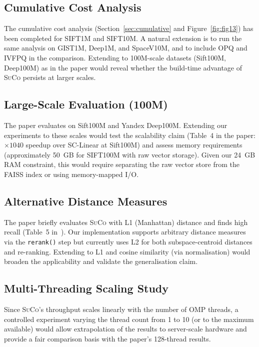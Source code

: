 \documentclass[11pt,a4paper]{article}
\newcommand{\suco}{\textsc{SuCo}}
\begin{document}
\subsection{Cumulative Cost Analysis}

The cumulative cost analysis (Section~\ref{sec:cumulative} and
Figure~\ref{fig:fig13}) has been completed for SIFT1M and SIFT10M.
A natural extension is to run the same analysis on GIST1M, Deep1M, and
SpaceV10M, and to include OPQ and IVFPQ in the comparison.
Extending to 100M-scale datasets (Sift100M, Deep100M) as in the paper would
reveal whether the build-time advantage of \suco{} persists at larger scales.

\subsection{Large-Scale Evaluation (100M)}

The paper evaluates on Sift100M and Yandex Deep100M.  Extending our
experiments to these scales would test the scalability claim (Table~4 in
the paper: $\times 1040$ speedup over SC-Linear at Sift100M) and assess
memory requirements (approximately 50~GB for SIFT100M with raw vector storage).
Given our 24~GB RAM constraint, this would require separating the raw vector
store from the FAISS index or using memory-mapped I/O.

\subsection{Alternative Distance Measures}

The paper briefly evaluates \suco{} with L1 (Manhattan) distance and finds
high recall (Table~5 in~\cite{wei2025suco}).  Our implementation supports
arbitrary distance measures via the \texttt{rerank()} step but currently
uses L2 for both subspace-centroid distances and re-ranking.  Extending to L1
and cosine similarity (via normalisation) would broaden the applicability and
validate the generalisation claim.

\subsection{Multi-Threading Scaling Study}

Since \suco{}'s throughput scales linearly with the number of OMP threads,
a controlled experiment varying the thread count from 1 to 10 (or to the
maximum available) would allow extrapolation of the results to server-scale
hardware and provide a fair comparison basis with the paper's 128-thread
results.
\end{document}
